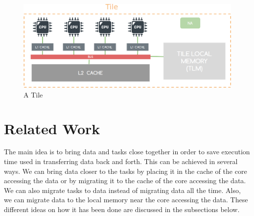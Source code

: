 \documentclass{listhesis}
\begin{document}
\begin{figure}
  \includegraphics[width=\linewidth]{tile.png}
  \centering
  \caption{A Tile}
  \label{fig:tile}
\end{figure}
\section{Related Work}
The main idea is to bring data and tasks close together in order to save execution time used in transferring data back and forth. This can be achieved in several ways. We can bring data closer to the tasks by placing it in the cache of the core accessing the data or by migrating it to the cache of the core accessing the data. We can also migrate tasks to data instead of migrating data all the time. Also, we can migrate data to the local memory near the core accessing the data. These different ideas on how it has been done are discussed in the subsections below. 
\end{document}
